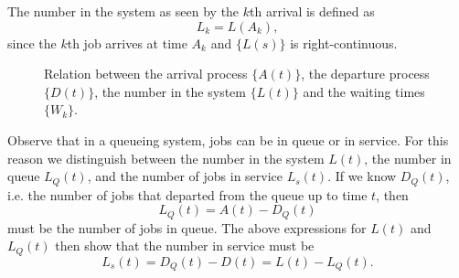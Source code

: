 The number in the system as seen by the $k$th arrival is defined as
\begin{equation}
  \label{eq:Lk}
  L_k = L(A_k), 
\end{equation}
since the $k$th job arrives at time $A_k$ and $\{L(s)\}$ is right-continuous.


\begin{figure}[t]
  \centering
{}

  
  \caption{Relation between the arrival process $\{A(t)\}$, the
    departure process $\{D(t)\}$, the number in the system $\{L(t)\}$
    and the waiting times $\{W_k\}$.}
  \label{fig:atltdt}
\end{figure}

Observe that in a queueing system, jobs can be in queue or in
service. For this reason we distinguish between the number in the
system $L(t)$, the number in queue $L_Q(t)$, and the number of jobs in
service $L_s(t)$. If we know $D_Q(t)$, i.e. the number of jobs that
departed from the queue up to time $t$, then
\begin{equation*}
  L_Q(t) = A(t) - D_Q(t)
\end{equation*}
must be the number of jobs in queue. The above expressions for $L(t)$
and $L_Q(t)$ then show that the number in service must be
\begin{equation*}
L_s(t) = D_Q(t) - D(t) = L(t) - L_Q(t).
\end{equation*}



